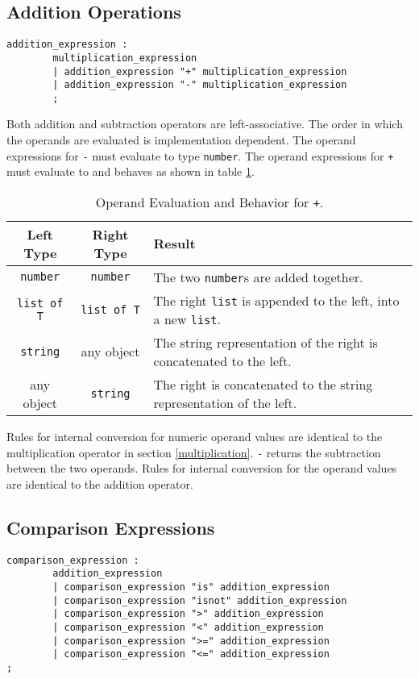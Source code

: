 \subsection{Addition Operations}\label{ref_expr_addition}
\begin{verbatim}
addition_expression : 
        multiplication_expression
        | addition_expression "+" multiplication_expression
        | addition_expression "-" multiplication_expression
        ;
\end{verbatim}

Both addition and subtraction operators are left-associative. The order in which the operands are evaluated is implementation dependent. The operand expressions for \texttt{-} must evaluate to type \texttt{number}. The operand expressions for \texttt{+} must evaluate to and behaves as shown in table \ref{plusstuff}.
\begin{table}[htdp]
\begin{center}
\begin{tabular}{|c|c|p{7cm}|}
\hline
Left Type & Right Type & Result\\
\hline
\texttt{number} & \texttt{number} & The two \texttt{number}s are added together.\\
\texttt{list of T} & \texttt{list of T} & The right \texttt{list} is appended to the left, into a new \texttt{list}.\\
\texttt{string} & any object & The string representation of the right is concatenated to the left.\\
any object & \texttt{string} & The right is concatenated to the string representation of the left.\\
\hline
\end{tabular}
\end{center}
\caption{Operand Evaluation and Behavior for \texttt{+}.}\label{plusstuff}
\end{table}%



Rules for internal conversion for numeric operand values are identical to the multiplication operator in section \ref{multiplication}. 
\texttt{-} returns the subtraction between the two operands. Rules for internal conversion for the operand values are identical to the addition operator.

\subsection{Comparison Expressions}\label{ref_expr_comp}
\begin{verbatim}
comparison_expression : 
        addition_expression
        | comparison_expression "is" addition_expression
        | comparison_expression "isnot" addition_expression
        | comparison_expression ">" addition_expression
        | comparison_expression "<" addition_expression
        | comparison_expression ">=" addition_expression
        | comparison_expression "<=" addition_expression
;
\end{verbatim}

